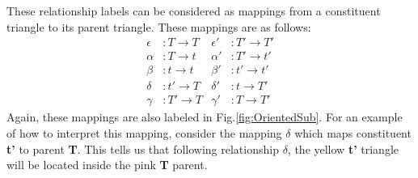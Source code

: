 \documentclass[
  oneside,
  11pt, a4paper,
  footinclude=true,
  headinclude=true,
  cleardoublepage=empty
]{scrbook}
\begin{document}
These relationship labels can be considered as mappings from a constituent triangle to its parent triangle. These mappings are as follows:
\begin{align}
\epsilon &: T \rightarrow T  &\epsilon' &: T' \rightarrow T' \nonumber\\  
\alpha &: T \rightarrow t  &\alpha' &: T' \rightarrow t' \nonumber\\  
\beta &: t \rightarrow t  &\beta' &: t' \rightarrow t' \label{eq:maps}\\  
\delta &: t' \rightarrow T  &\delta' &: t \rightarrow T' \nonumber\\ 
\gamma &: T' \rightarrow T  &\gamma' &: T \rightarrow T' \nonumber
\end{align}
Again, these mappings are also labeled in Fig.\ref{fig:OrientedSub}. For an example of how to interpret this mapping, consider the mapping $\delta$ which maps constituent \textbf{t'} to parent \textbf{T}. This tells us that following relationship $\delta$, the yellow \textbf{t'} triangle will be located inside the pink \textbf{T} parent.
\end{document}

